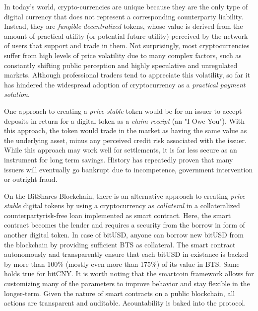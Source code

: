 In today's world, crypto-currencies are unique because they are the only type
of digital currency that does not represent a corresponding counterparty
liability. Instead, they are \emph{fungible} \emph{decentralized} tokens, whose
value is derived from the amount of practical utility (or potential future
utility) perceived by the network of users that support and trade in them. Not
surprisingly, most cryptocurrencies suffer from high levels of price volatility
due to many complex factors, such as constantly shifting public perception and
highly speculative and unregulated markets. Although professional traders tend
to appreciate this volatility, so far it has hindered the widespread adoption
of cryptocurrency as a \emph{practical payment solution}.

One approach to creating a \emph{price-stable} token would be for an issuer to
accept deposits in return for a digital token as a \emph{claim receipt} (an "I
Owe You"). With this approach, the token would trade in the market as having
the same value as the underlying asset, minus any perceived credit risk
associated with the issuer. While this approach may work well for settlements,
it is far less secure as an instrument for long term savings. History has
repeatedly proven that many issuers will eventually go bankrupt due to
incompetence, government intervention or outright fraud.

On the BitShares Blockchain, there is an alternative approach to creating
\emph{price stable} digital tokens by using a cryptocurrency as
\emph{collateral} in a collateralized counterpartyrisk-free loan implemented as
smart contract. Here, the smart contract becomes the lender and requires a
security from the borrow in form of another digital token. In case of bitUSD,
anyone can borrow new bitUSD from the blockchain by providing sufficient BTS as
collateral. The smart contract autonomously and transparently ensure that each
bitUSD in existance is backed by more than 100\% (mostly even more than 175\%)
of its value in BTS. Same holds true for bitCNY. It is worth noting that the
smartcoin framework allows for customizing many of the parameters to improve
behavior and stay flexible in the longer-term. Given the nature of smart
contracts on a public blockchain, all actions are transparent and auditable.
Acountability is baked into the protocol.

